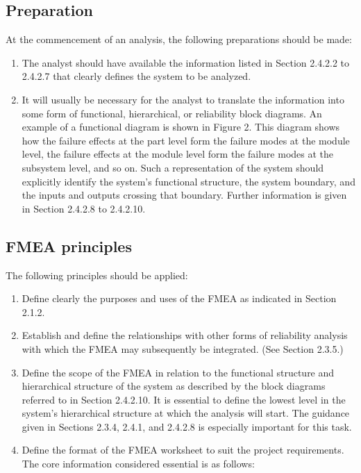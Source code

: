 \documentclass[./dissertation.tex]{subfiles}
\begin{document}
\subsection{Preparation}
At the commencement of an analysis, the following preparations should be made:
\begin{enumerate}
\item The analyst should have available the information listed in Section 2.4.2.2 to 2.4.2.7 that clearly defines the system to be analyzed.
\item It will usually be necessary for the analyst to translate the information into some form of functional, hierarchical, or reliability block diagrams. An example of a functional diagram is shown in Figure 2. This diagram shows how the failure effects at the part level form the failure modes at the module level, the failure effects at the module level form the failure modes at the subsystem level, and so on. Such a representation of the system should explicitly identify the system's functional structure, the system boundary, and the inputs and outputs crossing that boundary. Further information is given in Section 2.4.2.8 to 2.4.2.10.
\end{enumerate}

\subsection{FMEA principles}
The following principles should be applied:
\begin{enumerate}
\item Define clearly the purposes and uses of the FMEA as indicated in Section 2.1.2.
\item Establish and define the relationships with other forms of reliability analysis with which the FMEA may subsequently be integrated. (See Section 2.3.5.)
\item Define the scope of the FMEA in relation to the functional structure and hierarchical structure of the system as described by the block diagrams referred to in Section 2.4.2.10. It is essential to define the lowest level in the system's hierarchical structure at which the analysis will start. The guidance given in Sections 2.3.4, 2.4.1, and 2.4.2.8 is especially important for this task.
\item Define the format of the FMEA worksheet to suit the project requirements. The core information considered essential is as follows:
\end{enumerate}
\end{document}
